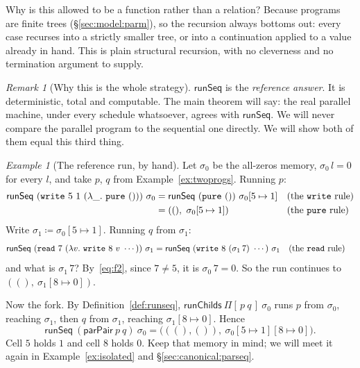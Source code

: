\documentclass[11pt,a4paper]{article}
\theoremstyle{definition}
\theoremstyle{plain}
\theoremstyle{remark}
\newtheorem{remark}[definition]{Remark}
\newtheorem{example}[definition]{Example}
\newcommand{\st}{\sigma}
\newcommand{\runSeq}{\mathsf{runSeq}}
\newcommand{\upd}[3]{#1[#2 \mapsto #3]}
\begin{document}
Why is this allowed to be a function rather than a relation? Because programs are finite
trees (\S\ref{sec:model:parm}), so the recursion always bottoms out: every case recurses
into a strictly smaller tree, or into a continuation applied to a value already in hand.
This is plain structural recursion, with no cleverness and no termination argument to
supply.

\begin{remark}[Why this is the whole strategy]\label{rem:strategy}
$\runSeq$ is the \emph{reference answer}. It is deterministic, total and computable. The
main theorem will say: the real parallel machine, under every schedule whatsoever, agrees
with $\runSeq$. We will never compare the parallel program to the sequential one directly.
We will show both of them equal this third thing.
\end{remark}

\begin{example}[The reference run, by hand]\label{ex:runseq}
Let $\st_0$ be the all-zeros memory, $\st_0\,l = 0$ for every $l$, and take $p$, $q$ from
Example~\ref{ex:twoprogs}. Running $p$:
\begin{align*}
  \runSeq\ (\texttt{write}\ 5\ 1\ (\lambda\_.\ \texttt{pure}\ ()))\ \st_0
    &= \runSeq\ (\texttt{pure}\ ())\ \upd{\st_0}{5}{1} && \text{(the \texttt{write} rule)} \\
    &= ((),\ \upd{\st_0}{5}{1}) && \text{(the \texttt{pure} rule)}
\end{align*}
Write $\st_1 \coloneqq \upd{\st_0}{5}{1}$. Running $q$ from $\st_1$:
\begin{align*}
  \runSeq\ (\texttt{read}\ 7\ (\lambda v.\ \texttt{write}\ 8\ v\ \cdots))\ \st_1
    &= \runSeq\ (\texttt{write}\ 8\ (\st_1\,7)\ \cdots)\ \st_1 && \text{(the \texttt{read} rule)}
\end{align*}
and what is $\st_1\,7$? By~\eqref{eq:f2}, since $7 \neq 5$, it is $\st_0\,7 = 0$. So the run
continues to $((),\ \upd{\st_1}{8}{0})$.

Now the fork. By Definition~\ref{def:runseq}, $\mathsf{runChilds}\ \Pi[\,p\ q\,]\ \st_0$ runs
$p$ from $\st_0$, reaching $\st_1$, then $q$ from $\st_1$, reaching $\upd{\st_1}{8}{0}$.
Hence
\[
  \runSeq\ (\mathsf{parPair}\ p\ q)\ \st_0 = \bigl(((),()),\ \upd{\upd{\st_0}{5}{1}}{8}{0}\bigr) .
\]
Cell $5$ holds $1$ and cell $8$ holds $0$. Keep that memory in mind; we will meet it again
in Example~\ref{ex:isolated} and \S\ref{sec:canonical:parseq}.
\end{example}
\end{document}

